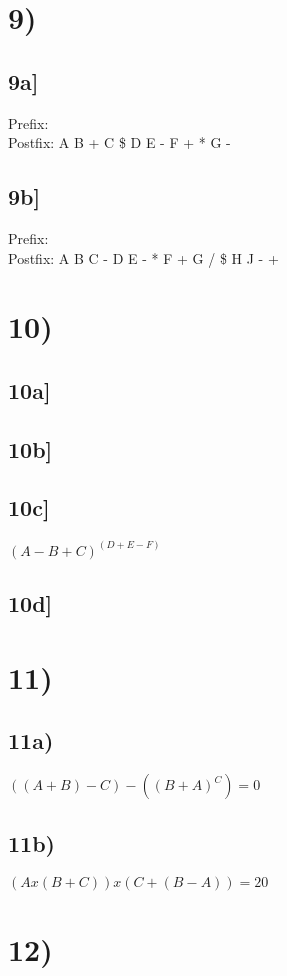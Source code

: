 \documentclass[a4paper,11pt]{article}
\begin{document}

\section*{9)}
\subsection*{9a]}
Prefix: \\
Postfix:  A B + C \$ D E - F + * G -
\subsection*{9b]}
Prefix:  \\
Postfix: A B C - D E - * F + G / \$ H J - +


\section*{10)}
\subsection*{10a]}
\subsection*{10b]}
\subsection*{10c]}
$(A - B + C) ^ (D + E - F)$
\subsection*{10d]}


\section*{11)}
\subsection*{11a)} 
$((A+B)-C) - ((B+A)^C) = 0$
\subsection*{11b)}
$(A x (B+C)) x (C+(B-A)) = 20$



\section*{12)}


\end{document}
